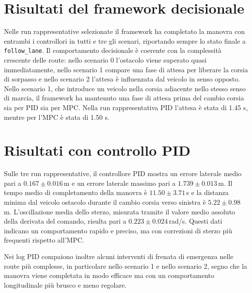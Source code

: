 \section{Risultati del framework decisionale}

Nelle run rappresentative selezionate il framework ha completato la manovra con entrambi i controllori in tutti e tre gli scenari, riportando sempre lo stato finale a \texttt{follow\_lane}. Il comportamento decisionale è coerente con la complessità crescente delle route: nello scenario 0 l'ostacolo viene superato quasi immediatamente, nello scenario 1 compare una fase di attesa per liberare la corsia di sorpasso e nello scenario 2 l'attesa è influenzata dal veicolo in senso opposto. Nello scenario 1, che introduce un veicolo nella corsia adiacente nello stesso senso di marcia, il framework ha mantenuto una fase di attesa prima del cambio corsia sia per PID sia per MPC. Nella run rappresentativa PID l'attesa è stata di 1.45 s, mentre per l'MPC è stata di 1.50 s. 



\section{Risultati con controllo PID}

Sulle tre run rappresentative, il controllore PID mostra un errore laterale medio pari a $0.167 \pm 0.016$\,m e un errore laterale massimo pari a $1.739 \pm 0.013$\,m. Il tempo medio di completamento della manovra è $11.50 \pm 3.71$\,s e la distanza minima dal veicolo ostacolo durante il cambio corsia verso sinistra è $5.22 \pm 0.98$\,m. L'oscillazione media dello sterzo, misurata tramite il valore medio assoluto della derivata del comando, risulta pari a $0.223 \pm 0.024$\,rad/s. Questi dati indicano un comportamento rapido e preciso, ma con correzioni di sterzo più frequenti rispetto all'MPC.

Nei log PID compaiono inoltre alcuni interventi di frenata di emergenza nelle route più complesse, in particolare nello scenario 1 e nello scenario 2, segno che la manovra viene completata in modo efficace ma con un comportamento longitudinale più brusco e meno regolare.





